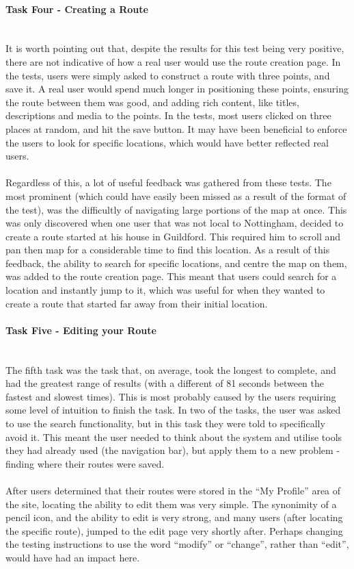 \paragraph{Task Four - Creating a Route}\ \\
It is worth pointing out that, despite the results for this test being very positive, there are not indicative of how a real user would use the route creation page. In the tests, users were simply asked to construct a route with three points, and save it. A real user would spend much longer in positioning these points, ensuring the route between them was good, and adding rich content, like titles, descriptions and media to the points. In the tests, most users clicked on three places at random, and hit the save button. It may have been beneficial to enforce the users to look for specific locations, which would have better reflected real users.\ \\
\ \\
Regardless of this, a lot of useful feedback was gathered from these tests. The most prominent (which could have easily been missed as a result of the format of the test), was the difficultly of navigating large portions of the map at once. This was only discovered when one user that was not local to Nottingham, decided to create a route started at his house in Guildford. This required him to scroll and pan then map for a considerable time to find this location. As a result of this feedback, the ability to search for specific locations, and centre the map on them, was added to the route creation page. This meant that users could search for a location and instantly jump to it, which  was useful for when they wanted to create a route that started far away from their initial location.
\ \\
\paragraph{Task Five - Editing your Route}\ \\
The fifth task was the task that, on average, took the longest to complete, and had the greatest range of results (with a different of 81 seconds between the fastest and slowest times). This is most probably caused by the users requiring some level of intuition to finish the task. In two of the tasks, the user was asked to use the search functionality, but in this task they were told to specifically avoid it. This meant the user needed to think about the system and utilise tools they had already used (the navigation bar), but apply them to a new problem - finding where their routes were saved.\ \\
\ \\
After users determined that their routes were stored in the ``My Profile'' area of the site, locating the ability to edit them was very simple. The synonimity of a pencil icon, and the ability to edit is very strong, and many users (after locating the specific route), jumped to the edit page very shortly after. Perhaps changing the testing instructions to use the word ``modify'' or ``change'', rather than ``edit'', would have had an impact here.

